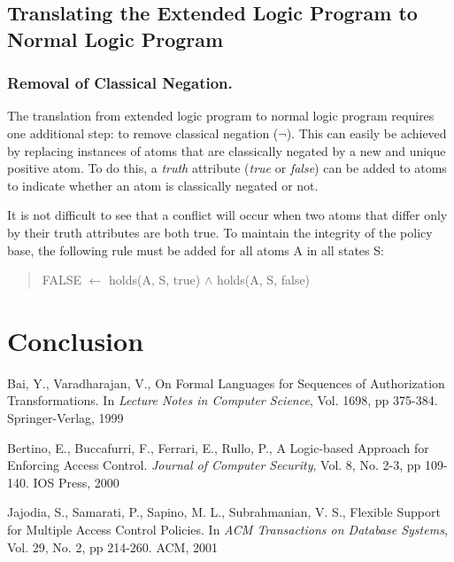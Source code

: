 \documentclass{llncs}
\begin{document}
    \subsection{Translating the Extended Logic Program to Normal Logic Program}

      \subsubsection{Removal of Classical Negation.}

        The translation from extended logic program to normal logic program
        requires one additional step: to remove classical negation ($\lnot$).
        This can easily be achieved by replacing instances of atoms that are
        classically negated by a new and unique positive atom. To do this,
        a \emph{truth} attribute (\emph{true} or \emph{false}) can be added to
        atoms to indicate whether an atom is classically negated or not.

        It is not difficult to see that a conflict will occur when two atoms
        that differ only by their truth attributes are both true. To maintain
        the integrity of the policy base, the following rule must be added 
        for all atoms A in all states S:

        \begin{quote}
          FALSE $\leftarrow$ holds(A, S, true) $\land$ holds(A, S, false)
        \end{quote}

  \section{Conclusion}

  \begin{thebibliography}{5}
      Bai, Y., Varadharajan, V.,
      On Formal Languages for Sequences of Authorization Transformations.
      In \emph{Lecture Notes in Computer Science},
      Vol. 1698,
      pp 375-384.
      Springer-Verlag, 1999

      Bertino, E., Buccafurri, F., Ferrari, E., Rullo, P.,
      A Logic-based Approach for Enforcing Access Control.
      \emph{Journal of Computer Security},
      Vol. 8, No. 2-3,
      pp 109-140.
      IOS Press, 2000

      Jajodia, S., Samarati, P., Sapino, M. L., Subrahmanian, V. S.,
      Flexible Support for Multiple Access Control Policies.
      In \emph{ACM Transactions on Database Systems},
      Vol. 29, No. 2,
      pp 214-260.
      ACM, 2001
  \end{thebibliography}
\end{document}
